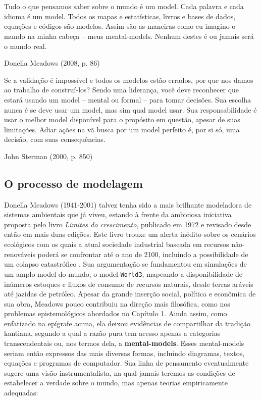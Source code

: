 \documentclass[./main.tex]{subfiles}
\begin{document}
\chapter{\chapSys} \label{chap:systems}

\setlength{\parskip}{0mm}

\epigraph{\small{Tudo o que pensamos saber sobre o mundo é um \gls{model}. Cada palavra e cada idioma é um \gls{model}. Todos os mapas e estatísticas, livros e bases de dados, equações e códigos são modelos. Assim são as maneiras como eu imagino o mundo na minha cabeça -- meus \gls{mental-models}. Nenhum destes é ou jamais será o mundo real.}}{Donella Meadows (2008, p. 86) \cite{meadows2008}}

\epigraph{\small{Se a validação é impossível e todos os modelos estão errados, por que nos damos ao trabalho de construí-los? Sendo uma liderança, você deve reconhecer que estará usando um \gls{model} -- mental ou formal -- para tomar decisões. Sua escolha nunca é se deve usar um \gls{model}, mas sim qual \gls{model} usar. Sua responsabilidade é usar o melhor \gls{model} disponível para o propósito em questão, apesar de suas limitações. Adiar ações na vã busca por um \gls{model} perfeito é, por si só, uma decisão, com suas consequências.}}{John Sterman (2000, p. 850) \cite{sterman2000}}

\setlength{\parskip}{\myparskip}

\section{O processo de modelagem} \label{sec:sys:process}

\par Donella Meadows (1941-2001) talvez tenha sido a mais brilhante modeladora de sistemas ambientais que já viveu, estando à frente da ambiciosa iniciativa proposta pelo livro \textit{Limites do crescimento}, publicado em 1972 e revisado desde então em mais duas edições. Este livro trouxe um alerta inédito sobre os cenários ecológicos com os quais a atual sociedade industrial baseada em recursos não-renováveis poderá se confrontar até o ano de 2100, incluindo a possibilidade de um colapso catastrófico \cite{meadows1974}. Sua argumentação se fundamentou em simulações de um amplo \gls{model} do mundo, o \gls{model} \texttt{World3}, mapeando a disponibilidade de inúmeros estoques e fluxos de consumo de recursos naturais, desde terras aráveis até jazidas de petróleo. Apesar da grande inserção social, política e econômica de sua obra, Meadows pouco contribuiu na direção mais filosófica, como nos problemas epistemológicos abordados no Capítulo 1. Ainda assim, como enfatizado na epígrafe acima, ela deixou evidências de compartilhar da tradição kantiana, segundo a qual a razão pura tem acesso apenas a categorias transcendentais ou, nos termos dela, a \textbf{\gls{mental-models}}. Esses \gls{mental-models} seriam então expressos das mais diversas formas, incluindo diagramas, textos, equações e programas de computador. Sua linha de pensamento eventualmente sugere uma visão instrumentalista, na qual jamais teremos as condições de estabelecer a verdade sobre o mundo, mas apenas teorias empiricamente adequadas:
\end{document}
